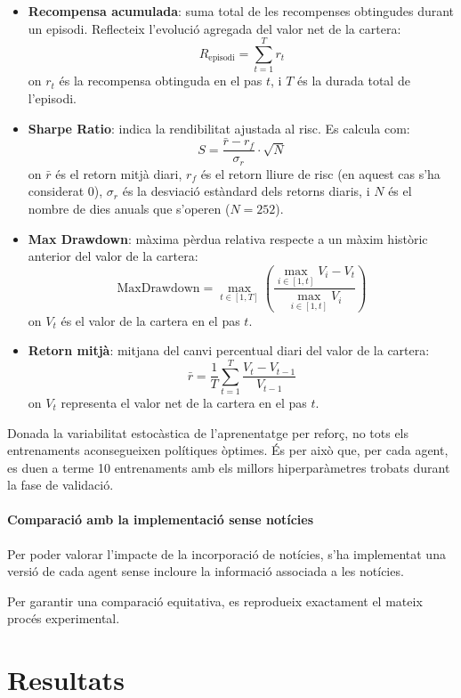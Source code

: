 \documentclass[12pt,a4paper,twoside]{book}
\begin{document}
\begin{itemize}
    \item \textbf{Recompensa acumulada}: suma total de les recompenses obtingudes durant un episodi. Reflecteix l'evolució agregada del valor net de la cartera:
    \[
    R_{\text{episodi}} = \sum_{t=1}^{T} r_t
    \]
    on $r_t$ és la recompensa obtinguda en el pas $t$, i $T$ és la durada total de l'episodi.

    \item \textbf{Sharpe Ratio}: indica la rendibilitat ajustada al risc. Es calcula com:
    \[
    S = \frac{\bar{r} - r_f}{\sigma_r} \cdot \sqrt{N}
    \]
    on $\bar{r}$ és el retorn mitjà diari, $r_f$ és el retorn lliure de risc (en aquest cas s'ha considerat 0), $\sigma_r$ és la desviació estàndard dels retorns diaris, i $N$ és el nombre de dies anuals que s'operen ($N = 252$).

    \item \textbf{Max Drawdown}: màxima pèrdua relativa respecte a un màxim històric anterior del valor de la cartera:
    \[
    \text{MaxDrawdown} = \max_{t \in [1,T]} \left( \frac{\max_{i \in [1,t]} V_i - V_t}{\max_{i \in [1,t]} V_i} \right)
    \]
    on $V_t$ és el valor de la cartera en el pas $t$.

    \item \textbf{Retorn mitjà}: mitjana del canvi percentual diari del valor de la cartera:
    \[
    \bar{r} = \frac{1}{T} \sum_{t=1}^{T} \frac{V_t - V_{t-1}}{V_{t-1}}
    \]
    on $V_t$ representa el valor net de la cartera en el pas $t$.
\end{itemize}


Donada la variabilitat estocàstica de l'aprenentatge per reforç, no tots els entrenaments aconsegueixen polítiques òptimes. És per això que, per cada agent, es duen a terme 10 entrenaments amb els millors hiperparàmetres trobats durant la fase de validació.

\subsubsection{Comparació amb la implementació sense notícies}

Per poder valorar l'impacte de la incorporació de notícies, s'ha implementat una versió de cada agent sense incloure la informació associada a les notícies.

Per garantir una comparació equitativa, es reprodueix exactament el mateix procés experimental.

\chapter{Resultats}
\end{document}

